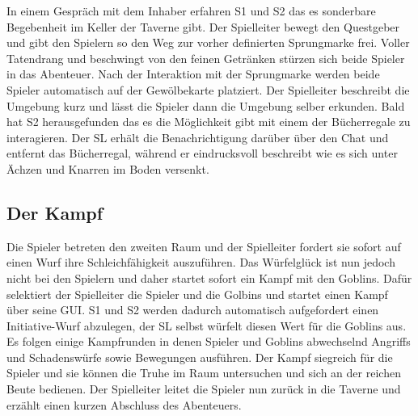 In einem Gespräch mit dem Inhaber erfahren S1 und S2 das es sonderbare Begebenheit im Keller der Taverne gibt. Der Spielleiter bewegt den Questgeber und gibt den Spielern so den Weg zur vorher definierten Sprungmarke frei.\newline
Voller Tatendrang und beschwingt von den feinen Getränken stürzen sich beide Spieler in das Abenteuer.
Nach der Interaktion mit der Sprungmarke werden beide Spieler automatisch auf der Gewölbekarte platziert. Der Spielleiter beschreibt die Umgebung kurz und lässt die Spieler dann die Umgebung selber erkunden. Bald hat S2 herausgefunden das es die Möglichkeit gibt mit einem der Bücherregale zu interagieren. Der SL erhält die Benachrichtigung darüber über den Chat und entfernt das Bücherregal, während er eindrucksvoll beschreibt wie es sich unter Ächzen und Knarren im Boden versenkt.\newline


\subsection{Der Kampf}
\label{sec:DerKampf}
Die Spieler betreten den zweiten Raum und der Spielleiter fordert sie sofort auf einen Wurf ihre Schleichfähigkeit auszuführen. Das Würfelglück ist nun jedoch nicht bei den Spielern und daher startet sofort ein Kampf mit den Goblins.\newline
Dafür selektiert der Spielleiter die Spieler und die Golbins und startet einen Kampf über seine GUI. S1 und S2 werden dadurch automatisch aufgefordert einen Initiative-Wurf abzulegen, der SL selbst würfelt diesen Wert für die Goblins aus. Es folgen einige Kampfrunden in denen Spieler und Goblins abwechselnd Angriffs und Schadenswürfe sowie Bewegungen ausführen.\newline
Der Kampf siegreich für die Spieler und sie können die Truhe im Raum untersuchen und sich an der reichen Beute bedienen. Der Spielleiter leitet die Spieler nun zurück in die Taverne und erzählt einen kurzen Abschluss des Abenteuers.


